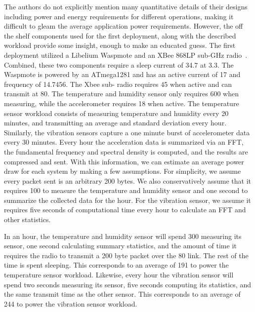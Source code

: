 The authors do not explicitly mention many quantitative details of their designs including power and energy requirements for different operations, making it difficult to gleam the average application power requirements.
However, the off the shelf components used for the first deployment, along with the described workload provide some insight, enough to make an educated guess.
The first deployment utilized a Libelium Waspmote and an XBee 868LP sub-\si{\giga\hertz} radio~\cite{waspmote,xbeeradio}.
Combined, these two components require a sleep current of 34.7\ssi{\micro\ampere} at 3.3\ssi{\volt}.
The Waspmote is powered by an ATmega1281 and has an active current of 17\ssi{\milli\ampere} and frequency of 14.7456\ssi{\mega\hertz}.
The Xbee sub-\ssi{\giga\hertz} radio requires 45\ssi{\milli\ampere} when active and can transmit at 80\ssi[per-mode=symbol]{\kilo\bit\per\second}.
The temperature and humidity sensor only requires 600\ssi{\micro\ampere} when measuring, while the accelerometer requires 18\ssi{\milli\ampere} when active.
The temperature sensor workload consists of measuring temperature and humidity every 20 minutes, and transmitting an average and standard deviation every hour.
Similarly, the vibration sensors capture a one minute burst of accelerometer data every 30 minutes.
Every hour the acceleration data is summarized via an FFT, the fundamental frequency and spectral density is computed, and the results are compressed and sent.
With this information, we can estimate an average power draw for each system by making a few assumptions.
For simplicity, we assume every packet sent is an arbitrary 200 bytes. We also conservatively assume that it requires 100\ssi{\milli\second} to measure the temperature and humidity sensor and one second to summarize the collected data for the hour. For the vibration sensor, we assume it requires five seconds of computational time every hour to calculate an FFT and other statistics. 

In an hour, the temperature and humidity sensor will spend 300\ssi{\milli\second} measuring its sensor, one second calculating summary statistics, and the amount of time it requires the radio to transmit a 200 byte packet over the 80\ssi[per-mode=symbol]{\kilo\bit\per\second} link.
The rest of the time is spent sleeping.
This corresponds to an average of 191\ssi{\micro\watt} to power the temperature sensor workload.
Likewise, every hour the vibration sensor will spend two seconds measuring its sensor, five seconds computing its statistics, and the same transmit time as the other sensor.
This corresponds to an average of  244\ssi{\micro\watt} to power the vibration sensor workload.

